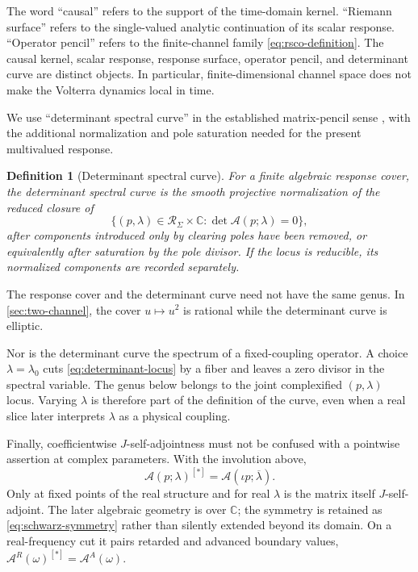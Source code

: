 \documentclass[11pt,reqno]{amsart}
\newtheorem{definition}[theorem]{Definition}
\theoremstyle{remark}
\newcommand{\C}{\mathbb C}
\newcommand{\cA}{\mathcal A}
\newcommand{\cR}{\mathcal R}
\begin{document}
The word ``causal'' refers to the support of the time-domain kernel.  ``Riemann
surface'' refers to the single-valued analytic continuation of its scalar
response.  ``Operator pencil'' refers to the finite-channel family
\eqref{eq:rsco-definition}.  The causal kernel, scalar response, response
surface, operator pencil, and determinant curve are distinct objects.  In
particular, finite-dimensional channel space does not make the Volterra
dynamics local in time.

We use ``determinant spectral curve'' in the established matrix-pencil sense
\cite{Izosimov2015}, with the additional normalization and pole saturation
needed for the present multivalued response.

\begin{definition}[Determinant spectral curve]\label{def:spectral-curve}
For a finite algebraic response cover, the determinant spectral curve is the
smooth projective normalization of the reduced closure of
\begin{equation}\label{eq:determinant-locus}
 \{(p,\lambda)\in\cR_\Sigma\times\C:
   \det\cA(p;\lambda)=0\},
\end{equation}
after components introduced only by clearing poles have been removed, or
equivalently after saturation by the pole divisor.  If the locus is
reducible, its normalized components are recorded separately.
\end{definition}

The response cover and the determinant curve need not have the same genus.
In \cref{sec:two-channel}, the cover $u\mapsto u^2$ is rational while the
determinant curve is elliptic.

Nor is the determinant curve the spectrum of a fixed-coupling operator.  A
choice $\lambda=\lambda_0$ cuts \eqref{eq:determinant-locus} by a fiber and
leaves a zero divisor in the spectral variable.  The genus below belongs to
the joint complexified $(p,\lambda)$ locus.  Varying $\lambda$ is therefore
part of the definition of the curve, even when a real slice later interprets
$\lambda$ as a physical coupling.

Finally, coefficientwise $J$-self-adjointness must not be confused with a
pointwise assertion at complex parameters.  With the involution above,
\begin{equation}\label{eq:schwarz-symmetry}
 \cA(p;\lambda)^{[*]}
 =\cA(\iota p;\overline\lambda).
\end{equation}
Only at fixed points of the real structure and for real $\lambda$ is the
matrix itself $J$-self-adjoint.  The later algebraic geometry is over $\C$;
the symmetry is retained as \eqref{eq:schwarz-symmetry} rather than silently
extended beyond its domain.  On a real-frequency cut it pairs retarded and
advanced boundary values, $\cA^R(\omega)^{[*]}=\cA^A(\omega)$.
\end{document}
